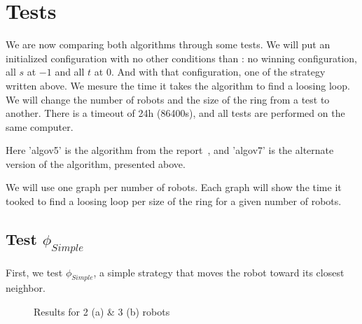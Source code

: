 \documentclass{article}
\begin{document}
\section{Tests}

We are now comparing both algorithms through some tests. We will put an initialized configuration with no other conditions than : no winning configuration, all $s$ at $-1$ and all $t$ at $0$. And with that configuration, one of the strategy written above. We mesure the time it takes the algorithm to find a loosing loop. We will change the number of robots and the size of the ring from a test to another. There is a timeout of 24h (86400s), and all tests are performed on the same computer.

Here 'algov5' is the algorithm from the report~\cite{algo}, and 'algov7' is the alternate version of the algorithm, presented above.

We will use one graph per number of robots. Each graph will show the time it tooked to find a loosing loop per size of the ring for a given number of robots.

\subsection{Test $\phi_{Simple}$}

First, we test $\phi_{Simple}$, a simple strategy that moves the robot toward its closest neighbor.

\begin{figure}[!ht]
    \centering
    \caption{Results for 2 (a) \& 3 (b) robots}
\end{figure}
\end{document}
